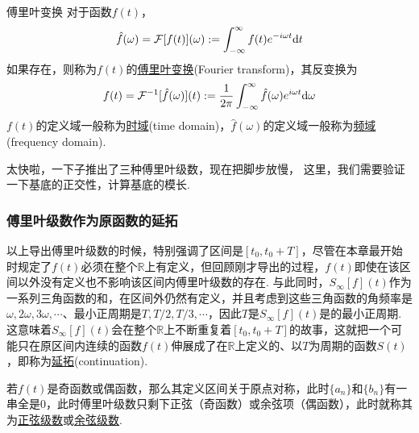\documentclass[main.tex]{subfiles}
\begin{document}
\begin{definition}{傅里叶变换}
    对于函数\(f(t)\)，
    \[\hat{f}(\omega) = \mathcal{F}[f(t)](\omega) := \int_{-\infty}^{\infty}f(t)e^{-i\omega t}{\rm d}t\]
    如果存在，则称为\(f(t)\)的\uline{傅里叶变换}(Fourier transform)，其反变换为
    \[f(t) = \mathcal{F}^{-1}[\hat{f}(\omega)](t) := \frac{1}{2\pi}\int_{-\infty}^{\infty}\hat{f}(\omega)e^{i\omega t}{\rm d}\omega\]
    \(f(t)\)的定义域一般称为\uline{时域}(time domain)，\(\hat{f}(\omega)\)的定义域一般称为\uline{频域}(frequency domain).
\end{definition}

太快啦，一下子推出了三种傅里叶级数，现在把脚步放慢，
这里，我们需要验证一下基底的正交性，计算基底的模长.


\vspace{1cm}

\subsubsection{傅里叶级数作为原函数的延拓}

以上导出傅里叶级数的时候，特别强调了区间是\([t_0,t_0+T]\)，尽管在本章最开始时规定了\(f(t)\)必须在整个\(\mathbb{R}\)上有定义，但回顾刚才导出的过程，\(f(t)\)即使在该区间以外没有定义也不影响该区间内傅里叶级数的存在. 与此同时，\(S_{\infty}[f](t)\)作为一系列三角函数的和，在区间外仍然有定义，并且考虑到这些三角函数的角频率是\(\omega, 2\omega, 3\omega, \cdots\)、最小正周期是\(T, T/2, T/3, \cdots\)，因此\(T\)是\(S_{\infty}[f](t)\)是的最小正周期. 这意味着\(S_{\infty}[f](t)\)会在整个\(\mathbb{R}\)上不断重复着\([t_0,t_0+T]\)的故事，这就把一个可能只在原区间内连续的函数\(f(t)\)伸展成了在\(\mathbb{R}\)上定义的、以\(T\)为周期的函数\(S(t)\)，即称为\uline{延拓}(continuation).

若\(f(t)\)是奇函数或偶函数，那么其定义区间关于原点对称，此时\(\{a_n\}\)和\(\{b_n\}\)有一串全是\(0\)，此时傅里叶级数只剩下正弦（奇函数）或余弦项（偶函数），此时就称其为\uline{正弦级数}或\uline{余弦级数}. 
\end{document}
